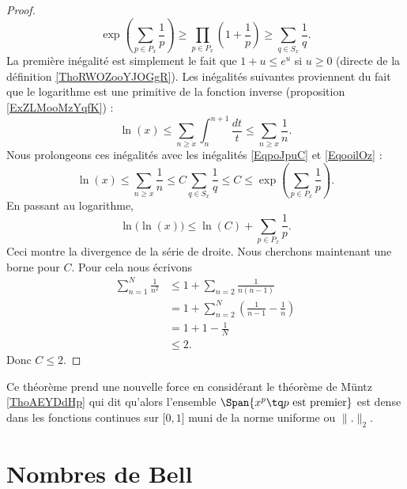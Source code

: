 \begin{proof}
\begin{equation}
        \exp\left( \sum_{p\in P_x}\frac{1}{ p } \right)\geq\prod_{p\in P_x}\left( 1+\frac{1}{ p } \right)\geq \sum_{q\in S_x}\frac{1}{ q }.
    \end{equation}
    La première inégalité est simplement le fait que \( 1+u\leq e^u\) si \( u\geq 0\) (directe de la définition \ref{ThoRWOZooYJOGgR}). Les inégalités suivantes proviennent du fait que le logarithme est une primitive de la fonction inverse (proposition \ref{ExZLMooMzYqfK}) :
    \begin{equation}
        \ln(x)\leq \sum_{n\geq x}\int_{n}^{n+1}\frac{dt}{ t }\leq \sum_{n\geq x}\frac{1}{ n }.
    \end{equation}
    Nous prolongeons ces inégalités avec les inégalités \eqref{EqpoJpuC} et \eqref{EqooilOz} :
    \begin{equation}
        \ln(x)\leq \sum_{n\geq x}\frac{1}{ n }\leq C\sum_{q\in S_x}\frac{1}{ q }\leq C\leq \exp\left( \sum_{p\in P_x}\frac{1}{ p } \right).
    \end{equation}
    En passant au logarithme,
    \begin{equation}
        \ln\big( \ln(x) \big)\leq\ln(C)+\sum_{p\in P_x}\frac{1}{ p }.
    \end{equation}
    Ceci montre la divergence de la série de droite. Nous cherchons maintenant une borne pour \( C\). Pour cela nous écrivons
    \begin{subequations}
        \begin{align}
            \sum_{n=1}^N\frac{1}{ n^2 }&\leq 1+\sum_{n=2}\frac{1}{ n(n-1) }\\
            &=1+\sum_{n=2}^N\left( \frac{1}{ n-1 }-\frac{1}{ n } \right)\\
            &=1+1-\frac{1}{ N }\\
            &\leq 2.
        \end{align}
    \end{subequations}
    Donc \( C\leq 2\).
\end{proof}
Ce théorème prend une nouvelle force en considérant le théorème de Müntz \ref{ThoAEYDdHp} qui dit qu'alors l'ensemble \( \Span\{ x^p\tq  p\text{ est premier} \}\) est dense dans les fonctions continues sur \( \mathopen[ 0 , 1 \mathclose]\) muni de la norme uniforme ou \( \| . \|_2\).

\section{Nombres de Bell}


